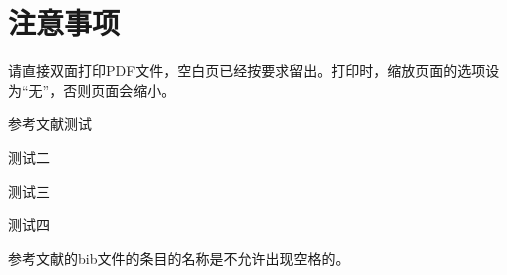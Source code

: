 
\chapter{注意事项}
\label{chap04}

请直接双面打印PDF文件，空白页已经按要求留出。打印时，缩放页面的选项设
为“无”，否则页面会缩小。

参考文献测试\cite{BRINKSMEIER1994}

测试二\cite{tc2015,zxb2015,lbm2003,lbm2009}

测试三\cite{Klingenberg1990,Metropolis1953,Cook1990}

测试四\cite{Rabinow1948,Rokhlin1985,1985Rosensweig,Tani1984}



参考文献的bib文件的条目的名称是不允许出现空格的。
